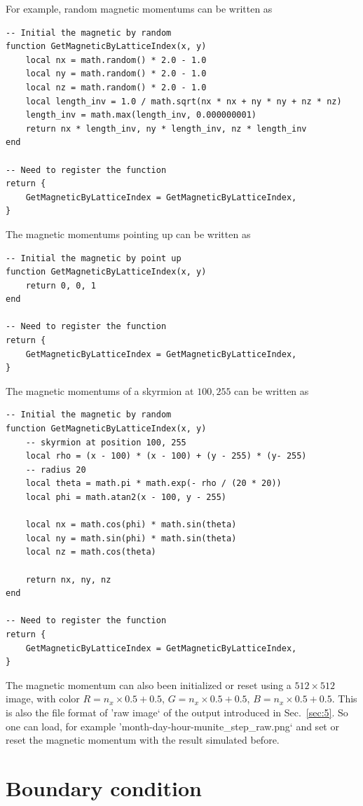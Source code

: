 \documentclass[aps,superscriptaddress,groupedaddress]{revtex4}  %
\begin{document}
For example, random magnetic momentums can be written as
\begin{lstlisting}
-- Initial the magnetic by random
function GetMagneticByLatticeIndex(x, y)
    local nx = math.random() * 2.0 - 1.0
    local ny = math.random() * 2.0 - 1.0
    local nz = math.random() * 2.0 - 1.0
    local length_inv = 1.0 / math.sqrt(nx * nx + ny * ny + nz * nz)
    length_inv = math.max(length_inv, 0.000000001)
    return nx * length_inv, ny * length_inv, nz * length_inv
end

-- Need to register the function
return {
    GetMagneticByLatticeIndex = GetMagneticByLatticeIndex,
}
\end{lstlisting}
The magnetic momentums pointing up can be written as
\begin{lstlisting}
-- Initial the magnetic by point up
function GetMagneticByLatticeIndex(x, y)
    return 0, 0, 1
end

-- Need to register the function
return {
    GetMagneticByLatticeIndex = GetMagneticByLatticeIndex,
}

\end{lstlisting}
The magnetic momentums of a skyrmion at $100,255$ can be written as
\begin{lstlisting}
-- Initial the magnetic by random
function GetMagneticByLatticeIndex(x, y)
    -- skyrmion at position 100, 255
    local rho = (x - 100) * (x - 100) + (y - 255) * (y- 255)
    -- radius 20
    local theta = math.pi * math.exp(- rho / (20 * 20))
    local phi = math.atan2(x - 100, y - 255)

    local nx = math.cos(phi) * math.sin(theta)
    local ny = math.sin(phi) * math.sin(theta)
    local nz = math.cos(theta)

    return nx, ny, nz
end

-- Need to register the function
return {
    GetMagneticByLatticeIndex = GetMagneticByLatticeIndex,
}
\end{lstlisting}

The magnetic momentum can also been initialized or reset using a $512\times 512$ image, with color $R=n_x\times 0.5+0.5$, $G=n_x\times 0.5+0.5$, $B=n_x\times 0.5+0.5$. This is also the file format of 'raw image` of the output introduced in Sec.~\ref{sec:5}. So one can load, for example 'month-day-hour-munite\_step\_raw.png` and set or reset the magnetic momentum with the result simulated before.

\section{\label{sec:4}Boundary condition}
\end{document}
